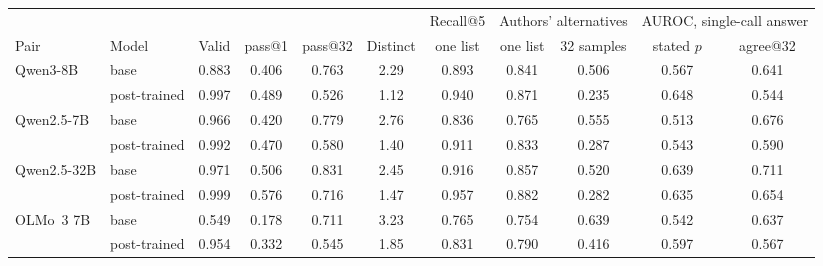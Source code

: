 \documentclass[11pt]{article}
\begin{document}
\begin{table}[t]
\centering\small
\begin{adjustbox}{max width=\linewidth}
\begin{tabular}{llccccccccc}
\toprule
 & & & & & & Recall@5 & \multicolumn{2}{c}{Authors' alternatives} & \multicolumn{2}{c}{AUROC, single-call answer} \\
Pair & Model & Valid & pass@1 & pass@32 & Distinct & one list & one list & 32 samples & stated $p$ & agree@32 \\
\midrule
Qwen3-8B & base & 0.883 & 0.406 & 0.763 & 2.29 & 0.893 & 0.841 & 0.506 & 0.567 & 0.641 \\
 & post-trained & 0.997 & 0.489 & 0.526 & 1.12 & 0.940 & 0.871 & 0.235 & 0.648 & 0.544 \\
Qwen2.5-7B & base & 0.966 & 0.420 & 0.779 & 2.76 & 0.836 & 0.765 & 0.555 & 0.513 & 0.676 \\
 & post-trained & 0.992 & 0.470 & 0.580 & 1.40 & 0.911 & 0.833 & 0.287 & 0.543 & 0.590 \\
Qwen2.5-32B & base & 0.971 & 0.506 & 0.831 & 2.45 & 0.916 & 0.857 & 0.520 & 0.639 & 0.711 \\
 & post-trained & 0.999 & 0.576 & 0.716 & 1.47 & 0.957 & 0.882 & 0.282 & 0.635 & 0.654 \\
OLMo~3 7B & base & 0.549 & 0.178 & 0.711 & 3.23 & 0.765 & 0.754 & 0.639 & 0.542 & 0.637 \\
 & post-trained & 0.954 & 0.332 & 0.545 & 1.85 & 0.831 & 0.790 & 0.416 & 0.597 & 0.567 \\
\bottomrule
\end{tabular}
\end{adjustbox}


\end{table}
\end{document}
